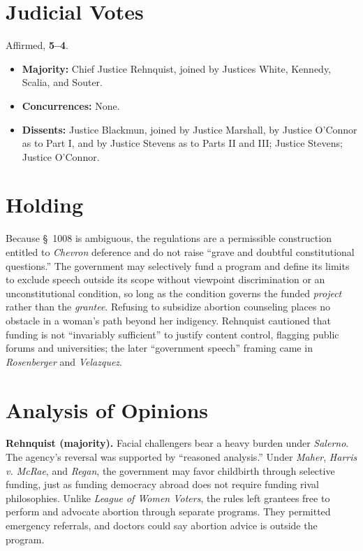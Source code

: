 \documentclass[12pt]{article}
\begin{document}
\section{Judicial Votes}

Affirmed, \textbf{5--4}.
\begin{itemize}
\item \textbf{Majority:} Chief Justice Rehnquist, joined by Justices White, Kennedy, Scalia, and Souter.
\item \textbf{Concurrences:} None.
\item \textbf{Dissents:} Justice Blackmun, joined by Justice Marshall, by Justice O'Connor as to Part I, and by Justice Stevens as to Parts II and III; Justice Stevens; Justice O'Connor.
\end{itemize}

\section{Holding}

Because \S~1008 is ambiguous, the regulations are a permissible construction entitled to \textit{Chevron} deference and do not raise ``grave and doubtful constitutional questions.'' The government may selectively fund a program and define its limits to exclude speech outside its scope without viewpoint discrimination or an unconstitutional condition, so long as the condition governs the funded \textit{project} rather than the \textit{grantee}. Refusing to subsidize abortion counseling places no obstacle in a woman's path beyond her indigency. Rehnquist cautioned that funding is not ``invariably sufficient'' to justify content control, flagging public forums and universities; the later ``government speech'' framing came in \textit{Rosenberger} and \textit{Velazquez}.

\section{Analysis of Opinions}

\textbf{Rehnquist (majority).} Facial challengers bear a heavy burden under \textit{Salerno}. The agency's reversal was supported by ``reasoned analysis.'' Under \textit{Maher}, \textit{Harris v. McRae}, and \textit{Regan}, the government may favor childbirth through selective funding, just as funding democracy abroad does not require funding rival philosophies. Unlike \textit{League of Women Voters}, the rules left grantees free to perform and advocate abortion through separate programs. They permitted emergency referrals, and doctors could say abortion advice is outside the program.
\end{document}
